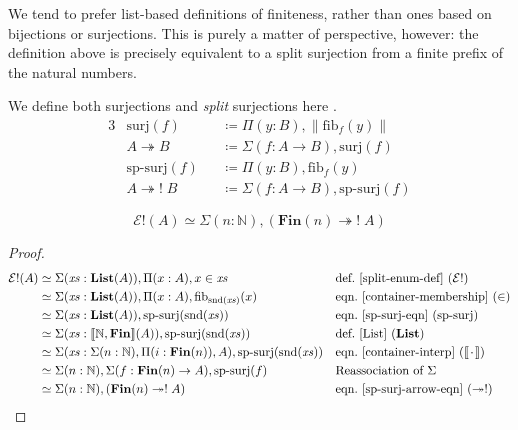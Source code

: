 We tend to prefer list-based definitions of finiteness, rather than ones based
on bijections or surjections.
This is purely a matter of perspective, however: the definition above is
precisely equivalent to a split surjection from a finite prefix of the natural
numbers.
\begin{definition}[Surjections] \label{surjections}
  We define both surjections and \emph{split} surjections here \cite[definition
  4.6.1]{hottbook}.
  \begin{alignat}{3}
    &\text{surj}(f)             &&\coloneqq \Pi(y : B) , \lVert \text{fib}_f(y) \rVert \\
    &A \twoheadrightarrow B     &&\coloneqq \Sigma (f : A \rightarrow B) , \text{surj}(f) \label{surj-arrow-eqn} \\
    &\text{sp-surj}(f)          &&\coloneqq \Pi(y : B) , \text{fib}_f(y) \label{sp-surj-eqn} \\
    &A \twoheadrightarrow! \; B &&\coloneqq \Sigma (f : A \rightarrow B) , \text{sp-surj}(f) \label{sp-surj-arrow-eqn}
  \end{alignat}
\end{definition}
\begin{lemma} \label{split-enum-is-split-surj}
  \begin{equation}
    \mathcal{E}!(A) \simeq \Sigma (n : \mathbb{N}) , \left( \mathbf{Fin}(n) \twoheadrightarrow ! \; A \right)
  \end{equation}
\end{lemma}
\begin{proof}
  \begin{align*}
     \mathcal{E}!(A) &
    \simeq \Sigma (\mathit{xs} : \textbf{List}(A)) , \Pi {(x : A)} , x \in \mathit{xs}
    && \text{def.~\ref{split-enum-def} }(\mathcal{E}!)
    \\
    & \simeq \Sigma (\mathit{xs} : \textbf{List}(A)) , \Pi {(x : A)} , \text{fib}_{\text{snd}(\mathit{xs})}(x)
    && \text{eqn.~\ref{container-membership} } (\in)
    \\
    & \simeq \Sigma (\mathit{xs} : \textbf{List}(A)) , \text{sp-surj}(\text{snd}(\mathit{xs}))
    && \text{eqn.~\ref{sp-surj-eqn} (sp-surj)}
    \\
    & \simeq \Sigma (\mathit{xs} : \llbracket \mathbb{N} , \mathbf{Fin} \rrbracket (A)) , \text{sp-surj}(\text{snd}(\mathit{xs}))
    && \text{def.~\ref{List} } (\mathbf{List})
    \\
    & \simeq \Sigma (\mathit{xs} : \Sigma (n : \mathbb{N}) , \Pi (i : \mathbf{Fin}(n)) , A) , \text{sp-surj}(\text{snd}(\mathit{xs}))
    && \text{eqn.~\ref{container-interp} } (\llbracket {\mkern 2mu\cdot\mkern 2mu} \rrbracket)
    \\
    & \simeq \Sigma (n : \mathbb{N}) , \Sigma (f : \mathbf{Fin}(n) \rightarrow A) , \text{sp-surj}(f)
    && \text{Reassociation of } \Sigma
    \\
    & \simeq \Sigma (n : \mathbb{N}) , ( \mathbf{Fin}(n) \twoheadrightarrow ! \; A )
    && \text{eqn.~\ref{sp-surj-arrow-eqn} } (\twoheadrightarrow!)
  \end{align*}
\end{proof}

